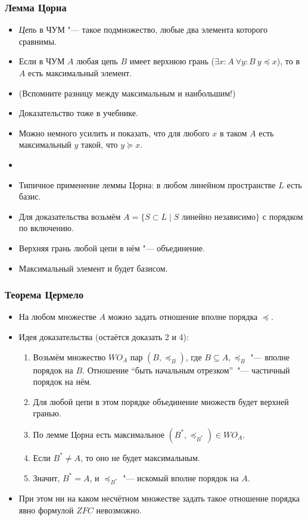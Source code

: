 \documentclass[10pt]{beamer}
\begin{document}
\begin{frame}
    \frametitle{Лемма Цорна}
    \begin{itemize}
        \item \emph{Цепь} в ЧУМ "--- такое подмножество, любые два элемента которого сравнимы.
        \item Если в ЧУМ $A$ любая цепь $B$ имеет верхнюю грань ($\exists x : A ~ \forall y : B ~ y \preccurlyeq x$), то в $A$ есть максимальный элемент.
        \item (Вспомните разницу между максимальным и наибольшим!)
        \item Доказательство тоже в учебнике.
        \pause
        \item Можно немного усилить и показать, что для любого $x$ в таком $A$ есть максимальный $y$ такой, что $y \succcurlyeq x$.
        \pause
        \item[]
        \item Типичное применение леммы Цорна: в любом линейном пространстве $L$ есть базис.
        \pause
        \item Для доказательства возьмём $A = \{S \subset L \mid S$ линейно независимо$\}$ с порядком по включению.
        \item Верхняя грань любой цепи в нём "--- объединение.
        \item Максимальный элемент и будет базисом.
    \end{itemize}
\end{frame}

\begin{frame}
    \frametitle{Теорема Цермело}
    \begin{itemize}
        \item На любом множестве $A$ можно задать отношение вполне порядка $\preccurlyeq$.
        \item Идея доказательства (остаётся доказать 2 и 4):
        \begin{enumerate}
            \item Возьмём множество $WO_A$ пар $(B, \preccurlyeq_B)$, где $B \subseteq A, \preccurlyeq_B$ "--- вполне порядок на $B$. Отношение \enquote{быть начальным отрезком}~"--- частичный порядок на нём.
            \item Для любой цепи в этом порядке объединение множеств будет верхней гранью.
            \item По лемме Цорна есть максимальное $(B^*, \preccurlyeq_{B^*}) \in WO_A$.
            \item Если $B^* \neq A$, то оно не будет максимальным.
            \item Значит, $B^* = A$, и $\preccurlyeq_{B^*}$ "--- искомый вполне порядок на $A$.
        \end{enumerate}
        \item При этом ни на каком несчётном множестве задать такое отношение порядка явно формулой $ZFC$ невозможно.
    \end{itemize}
\end{frame}
\end{document}
